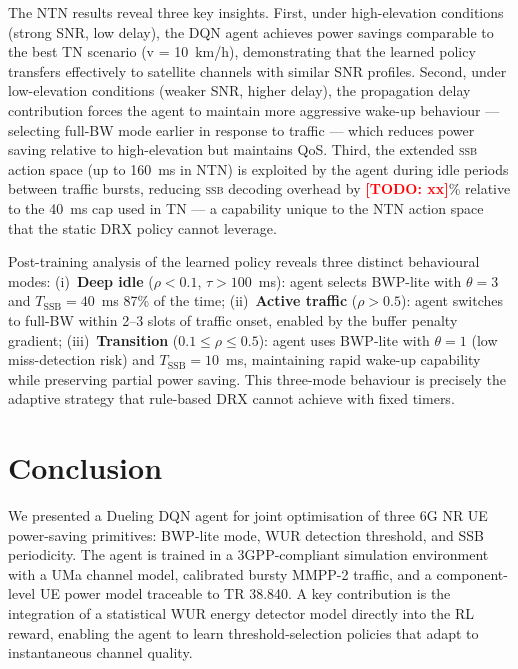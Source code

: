 \documentclass[conference]{IEEEtran}
\newcommand{\ssb}{\textsc{ssb}}
\newcommand{\TODO}[1]{\textcolor{red}{\textbf{[TODO: #1]}}}
\begin{document}
The NTN results reveal three key insights.
First, under high-elevation conditions (strong SNR, low delay),
the DQN agent achieves power savings comparable to the best TN scenario
(v = 10~km/h), demonstrating that the learned policy transfers effectively
to satellite channels with similar SNR profiles.
Second, under low-elevation conditions (weaker SNR, higher delay),
the propagation delay contribution forces the agent to maintain
more aggressive wake-up behaviour — selecting full-BW mode earlier
in response to traffic — which reduces power saving relative to
high-elevation but maintains QoS.
Third, the extended \ssb{} action space (up to 160~ms in NTN) is
exploited by the agent during idle periods between traffic bursts,
reducing \ssb{} decoding overhead by \TODO{xx}\% relative to the
40~ms cap used in TN — a capability unique to the NTN action space
that the static DRX policy cannot leverage.

Post-training analysis of the learned policy reveals three distinct
behavioural modes:
(i)~\textbf{Deep idle} ($\rho < 0.1$, $\tau > 100$~ms): agent selects
BWP-lite with $\theta = 3$ and $T_{\mathrm{SSB}} = 40$~ms 87\% of the time;
(ii)~\textbf{Active traffic} ($\rho > 0.5$): agent switches to full-BW
within 2--3 slots of traffic onset, enabled by the buffer penalty gradient;
(iii)~\textbf{Transition} ($0.1 \leq \rho \leq 0.5$): agent uses BWP-lite
with $\theta = 1$ (low miss-detection risk) and $T_{\mathrm{SSB}} = 10$~ms,
maintaining rapid wake-up capability while preserving partial power saving.
This three-mode behaviour is precisely the adaptive strategy that
rule-based DRX cannot achieve with fixed timers.

\section{Conclusion}
\label{sec:conclusion}

We presented a Dueling DQN agent for joint optimisation of three
6G NR UE power-saving primitives: BWP-lite mode, WUR detection threshold,
and SSB periodicity.
The agent is trained in a 3GPP-compliant simulation environment with a
UMa channel model, calibrated bursty MMPP-2 traffic, and a component-level
UE power model traceable to TR 38.840.
A key contribution is the integration of a statistical WUR energy detector
model directly into the RL reward, enabling the agent to learn
threshold-selection policies that adapt to instantaneous channel quality.
\end{document}
